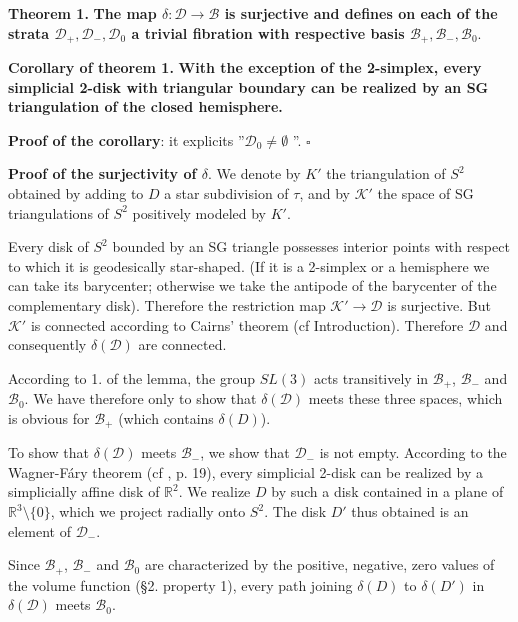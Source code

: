 \documentclass[12pt]{article}
\begin{document}
\textbf{Theorem 1.} \textbf{The map $\delta : \mathcal{D} \to \mathcal{B}$ is surjective and defines
on each of the strata $\mathcal{D}_+, \mathcal{D}_-, \mathcal{D}_0$ a trivial fibration with
respective basis $\mathcal{B}_+, \mathcal{B}_-, \mathcal{B}_0$}.



\textbf{Corollary of theorem 1.} \textbf{With the exception of the 2-simplex, every simplicial 2-disk
with triangular boundary can be realized by an SG triangulation of the closed hemisphere.}

\textbf{Proof of the corollary}: it explicits ''$\mathcal{D}_0 \neq \emptyset$ ''. $\square$


\textbf{Proof of the surjectivity of $\delta$}. We denote by $K'$ the triangulation of $S^2$ obtained
by adding to $D$ a star subdivision of $\tau$, and by $\mathcal{K}'$ the space of SG triangulations of
$S^2$ positively modeled by $K'$.

Every disk of $S^2$ bounded by an SG triangle possesses interior points with respect to which it is
geodesically star-shaped. (If it is a 2-simplex or a hemisphere we can take its barycenter; otherwise
we take the antipode of the barycenter of the complementary disk). Therefore the restriction map
$\mathcal{K}' \to \mathcal{D}$ is surjective. But $\mathcal{K}'$ is connected according to Cairns'
theorem (cf Introduction). Therefore $\mathcal{D}$ and consequently $\delta(\mathcal{D})$ are
connected.

According to 1. of the lemma, the group $SL(3)$ acts transitively in $\mathcal{B}_+$,
$\mathcal{B}_-$ and $\mathcal{B}_0$. We have therefore only to show that $\delta(\mathcal{D})$ meets
these three spaces, which is obvious for $\mathcal{B}_+$ (which contains $\delta(D)$).

To show that $\delta(\mathcal{D})$ meets $\mathcal{B}_-$, we show that $\mathcal{D}_-$ is not
empty. According to the Wagner-F\'{a}ry theorem (cf \cite{richter}, p. 19), every simplicial 2-disk can be realized
by a simplicially affine disk of $\mathbb{R}^2$. We realize $D$ by such a disk contained in a plane of
$\mathbb{R}^3 \setminus \{0\}$, which we project radially onto $S^2$. The disk $D'$ thus obtained
is an element of $\mathcal{D}_-$.

Since $\mathcal{B}_+$, $\mathcal{B}_-$ and $\mathcal{B}_0$ are characterized by the positive,
negative, zero values of the volume function (\S 2. property 1), every path joining 
 $\delta(D)$ to $\delta(D')$ in $\delta(\mathcal{D})$ meets $\mathcal{B}_0$.
 
\end{document}
